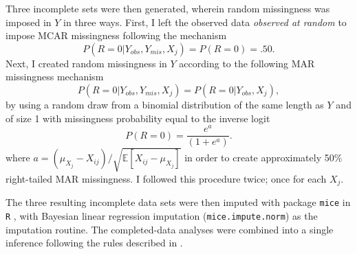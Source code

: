\documentclass[12pt, a4paper]{article}
\begin{document}
Three incomplete sets were then generated, wherein random missingness was imposed in $Y$ in three ways. First, I left the observed data \emph{observed at random} to impose MCAR missingness following the mechanism 
\begin{equation*}
P(R=0|Y_{obs},Y_{mis}, X_j)=P(R=0)=.50.
\end{equation*}
Next, I created random missingness in $Y$ according to the following MAR missingness mechanism
\begin{equation*}
P(R=0|Y_{obs},Y_{mis}, X_j)=P(R=0|Y_{obs}, X_j),
\end{equation*}
by using a random draw from a binomial distribution of the same length as $Y$ and of size 1 with missingness probability equal to the inverse logit
\begin{equation*}
P(R=0)=\frac{e^{a}}{(1+e^{a})}.
\end{equation*}
where $a=(\mu_{X_j}-X_{ij})/\sqrt{\mathbb{E}[X_{ij} - \mu_{X_j}]}$ in order to create approximately 50\% right-tailed MAR missingness. I followed this procedure twice; once for each $X_j$. 

The three resulting incomplete data sets were then imputed with package \texttt{mice} \citep[][v2.25]{mice} in \texttt{R} \citep[][v3.2.3]{R}, with Bayesian linear regression imputation (\texttt{mice.impute.norm}) as the imputation routine.  The completed-data analyses were combined into a single inference following the rules described in \citet{vink2014pooling}. 



\end{document}
